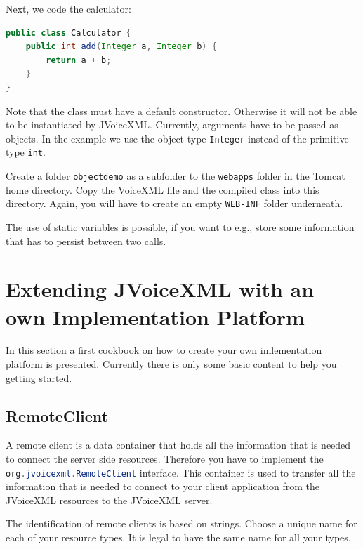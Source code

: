 \documentclass[11pt,a4paper]{book}
\begin{document}
Next, we code the calculator:
\begin{lstlisting}[language=Java]
public class Calculator {
    public int add(Integer a, Integer b) {
        return a + b;
    }
}
\end{lstlisting}

Note that the class must have a default constructor. Otherwise it will not be
able to be instantiated by JVoiceXML. Currently, arguments have to be passed as
objects. In the example we use the object type \lstinline{Integer} instead of
the primitive type \lstinline{int}.

Create a folder \lstinline{objectdemo} as a subfolder to the \lstinline{webapps}
folder in the Tomcat home directory. Copy the VoiceXML file and the compiled
class into this directory. Again, you will have to create an empty
\lstinline{WEB-INF} folder underneath.

The use of static variables is possible, if you want
to e.g., store some information that has to persist between two calls.

\chapter{Extending JVoiceXML with an own Implementation Platform}

In this section a first cookbook on how to create your own imlementation
platform is presented. Currently there is only some basic content to help you
getting started.


\section{RemoteClient}

A remote client is a data container that holds all the information that is
needed to connect the server side resources. Therefore you have to implement
the \lstinline[language=Java]{org.jvoicexml.RemoteClient} interface. This
container is used to transfer all the information that is needed to connect to
your client application from the JVoiceXML resources to the JVoiceXML server.

The identification of remote clients is based on strings. Choose a unique name
for each of your resource types. It is legal to have the same name for all your
types.
\end{document}
